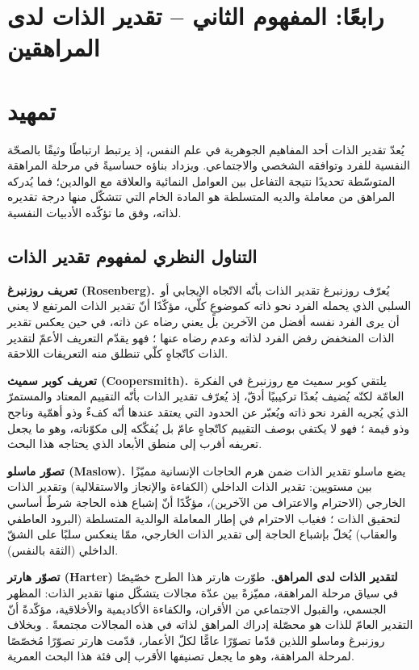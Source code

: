 \section{رابعًا: المفهوم الثاني -- تقدير الذات لدى المراهقين}
\section*{تمهيد}
يُعدّ تقدير الذات أحد المفاهيم الجوهرية في علم النفس، إذ يرتبط ارتباطًا وثيقًا بالصحّة النفسية للفرد
وتوافقه الشخصي والاجتماعي. ويزداد بناؤه حساسيةً في مرحلة المراهقة المتوسّطة تحديدًا نتيجة التفاعل بين
العوامل النمائية والعلاقة مع الوالدين؛ فما يُدركه المراهق من معاملة والديه المتسلطة هو المادة الخام التي
تتشكّل منها درجة تقديره لذاته، وفق ما تؤكّده الأدبيات النفسية.

\subsection{التناول النظري لمفهوم تقدير الذات}
\noindent\textbf{تعريف روزنبرغ (Rosenberg).}\ يُعرّف روزنبرغ تقدير الذات بأنّه الاتّجاه الإيجابي أو
السلبي الذي يحمله الفرد نحو ذاته كموضوعٍ كلّي، مؤكّدًا أنّ تقدير الذات المرتفع لا يعني أن يرى الفرد
نفسه أفضل من الآخرين بل يعني رضاه عن ذاته، في حين يعكس تقدير الذات المنخفض رفض الفرد لذاته
وعدم رضاه عنها ؛ فهو يقدّم التعريف الأعمّ لتقدير الذات كاتّجاهٍ كلّي تنطلق منه
التعريفات اللاحقة.

\noindent\textbf{تعريف كوبر سميث (Coopersmith).}\ يلتقي كوبر سميث مع روزنبرغ في الفكرة العامّة
لكنّه يُضيف بُعدًا تركيبيًا أدقّ، إذ يُعرّف تقدير الذات بأنّه التقييم المعتاد والمستمرّ الذي يُجريه الفرد نحو
ذاته ويُعبّر عن الحدود التي يعتقد عندها أنّه كفءٌ وذو أهمّية وناجح وذو قيمة ؛
فهو لا يكتفي بوصف التقييم كاتّجاهٍ عامّ بل يُفكّكه إلى مكوّناته، وهو ما يجعل تعريفه أقرب إلى منطق
الأبعاد الذي يحتاجه هذا البحث.

\noindent\textbf{تصوّر ماسلو (Maslow).}\ يضع ماسلو تقدير الذات ضمن هرم الحاجات الإنسانية مميّزًا
بين مستويين: تقدير الذات الداخلي (الكفاءة والإنجاز والاستقلالية) وتقدير الذات الخارجي (الاحترام
والاعتراف من الآخرين)، مؤكّدًا أنّ إشباع هذه الحاجة شرطٌ أساسي لتحقيق الذات ؛
فغياب الاحترام في إطار المعاملة الوالدية المتسلطة (البرود العاطفي والعقاب) يُخلّ بإشباع الحاجة إلى
تقدير الذات الخارجي، ممّا ينعكس سلبًا على الشقّ الداخلي (الثقة بالنفس).

\noindent\textbf{تصوّر هارتر (Harter) لتقدير الذات لدى المراهق.}\ طوّرت هارتر هذا الطرح خصّيصًا في
سياق مرحلة المراهقة، مميّزةً بين عدّة مجالات يتشكّل منها تقدير الذات: المظهر الجسمي، والقبول
الاجتماعي من الأقران، والكفاءة الأكاديمية والأخلاقية، مؤكّدةً أنّ التقدير العامّ للذات هو محصّلة إدراك
المراهق لذاته في هذه المجالات مجتمعةً . وبخلاف روزنبرغ وماسلو اللذين قدّما تصوّرًا
عامًّا لكلّ الأعمار، قدّمت هارتر تصوّرًا مُخصّصًا لمرحلة المراهقة، وهو ما يجعل تصنيفها الأقرب إلى فئة
هذا البحث العمرية.

